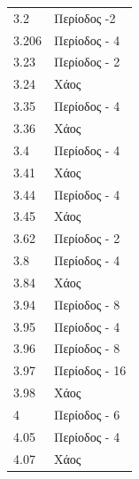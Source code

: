 \begin{table}[ht]
\begin{tabular}{l | l}
		3.2 & Περίοδος -2\\
		3.206 & Περίοδος -  4\\
		3.23 & Περίοδος -  2\\
		3.24 & Χάος\\
		3.35 & Περίοδος -  4\\
		3.36 & Χάος\\
		3.4 & Περίοδος -  4\\
		3.41 & Χάος\\
		3.44 & Περίοδος -  4\\
		3.45 & Χάος\\
		3.62 & Περίοδος -  2\\
		3.8 & Περίοδος -  4\\
		3.84 & Χάος\\
		3.94 & Περίοδος -  8\\
		3.95 & Περίοδος -  4\\
		3.96 & Περίοδος -  8\\
		3.97 & Περίοδος -  16\\
		3.98 & Χάος\\
		4 & Περίοδος -  6\\
		4.05&Περίοδος - 4\\
		4.07 & Χάος\\
		
	\end{tabular}
	
\end{table}


